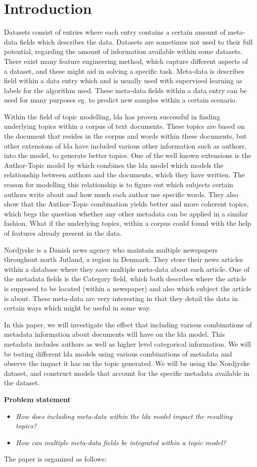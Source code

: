 \section{Introduction}\label{sec:introduction}
Datasets consist of entries where each entry contains a certain amount of meta-data fields which describes the data.
Datasets are sometimes not used to their full potential, regarding the amount of information available within some datasets.
There exist many feature engineering method, which capture different aspects of a dataset, and these might aid in solving a specific task.
Meta-data is describes field within a data entry which and is usually used with supervised learning as labels for the algorithm used.
These meta-data fields within a data entry can be used for many purposes eg. to predict new samples within a certain scenario.

Within the field of topic modelling, \Gls{lda} has proven successful in finding underlying topics within a corpus of text documents.
These topics are based on the document that resides in the corpus and words within these documents, but other extensions of \gls{lda} have included various other information such as authors, into the model, to generate better topics.
One of the well known extensions is the Author-Topic model by \citet{author_topic} which combines the \gls{lda} model which models the relationship between authors and the documents, which they have written.
The reason for modelling this relationship is to figure out which subjects certain authors write about and how much each author use specific words. 
They also show that the Author-Topic combination yields better and more coherent topics, which begs the question whether any other metadata can be applied in a similar fashion.
What if the underlying topics, within a corpus could found with the help of features already present in the data.

Nordjyske is a Danish news agency who maintain multiple newspapers throughout north Jutland, a region in Denmark.
They store their news articles within a database where they save multiple meta-data about each article.
One of the metadata fields is the Category field, which both describes where the article is supposed to be located (within a newspaper) and also which subject the article is about.
These meta-data are very interesting in that they detail the data in certain ways which might be useful in some way.

In this paper, we will investigate the effect that including various combinations of metadata information about documents will have on the \gls{lda} model.
This metadata includes authors as well as higher level categorical information.
We will be testing different \gls{lda} models using various combinations of metadata and observe the impact it has on the topic generated.
We will be using the Nordjyske dataset, and construct models that account for the specific metadata available in the dataset.

\textbf{Problem statement}
\begin{itemize}
	\item \textit{How does including meta-data within the \gls{lda} model impact the resulting topics?}
	\item \textit{How can multiple meta-data fields be integrated within a topic model?}
\end{itemize}
	
The paper is organized as follows: 
